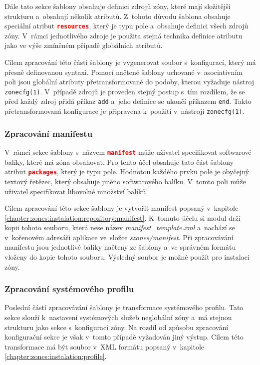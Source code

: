 Dále tato sekce šablony obsahuje definici zdrojů zóny, které mají složitější strukturu a~obsahují několik atributů. Z~tohoto
důvodu šablona obsahuje speciální atribut \lstinline[language=json]{resources}, který je typu pole a~obsahuje definici
všech zdrojů zóny. V~rámci jednotlivého zdroje je použita stejná technika definice atributu jako ve výše zmíněném případě
globálních atributů.

Cílem zpracování této části šablony je vygenerovat soubor s~konfigurací, který má přesně definovanou syntaxi. Pomocí načtené
šablony uchované v~asociativním poli jsou globální atributy přetransformované do podoby, kterou vyžaduje nástroj \verb|zonecfg(1)|.
V~případě zdrojů je proveden stejný postup s~tím rozdílem, že se před každý zdroj přidá příkaz \verb|add| a~jeho definice
se ukončí příkazem \verb|end|. Takto přetransformovaná konfigurace je připravena k~použití v~nástroji \verb|zonecfg(1)|.
\subsubsection{Zpracování manifestu}
\label{chapter:implementation:szones:template:manifest}
V~rámci sekce šablony s~názvem \lstinline[language=json]{manifest} může uživatel specifikovat softwarové balíky, které má zóna obsahovat.
Pro tento účel obsahuje tato část šablony atribut \lstinline[language=json]{packages}, který je typu pole. Hodnotou každého
prvku pole je obyčejný textový řetězec, který obsahuje jméno softwarového balíku. V~tomto poli může uživatel specifikovat libovolné
množství balíků. 

Cílem zpracování této sekce šablony je vytvořit manifest popsaný v~kapitole \ref{chapter:zones:instalation:repozitory:manifest}.
K~tomuto účelu si modul drží kopii tohoto souboru, která nese název \textit{manifest\_template.xml} a~nachází se v~kořenovém 
adresáři aplikace ve~složce \textit{szones/manifest}. Při zpracovávání manifestu jsou jednotlivé balíky načteny ze šablony
a~ve správném formátu vloženy do kopie tohoto souboru. Výsledný soubor je možné použít pro instalaci zóny.
\subsubsection{Zpracování systémového profilu}
\label{chapter:implementation:szones:template:profile}
Poslední částí zpracovávání šablony je transformace systémového profilu. Tato sekce slouží k~nastavení systémových služeb
neglobální zóny a~má stejnou strukturu jako sekce s~konfigurací zóny. Na rozdíl od způsobu zpracování konfigurační sekce je
však v~tomto případě vyžadován jiný výstup. Cílem této transformace má být soubor v~XML formátu popsaný v~kapitole \ref{chapter:zones:instalation:profile}.

